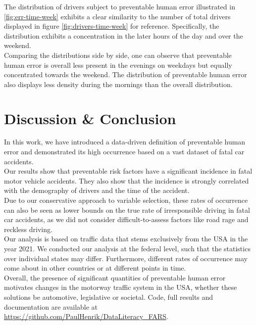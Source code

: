 \documentclass{article}
\theoremstyle{plain}
\theoremstyle{definition}
\theoremstyle{remark}
\begin{document}
\hfill \break
The distribution of drivers subject to preventable human error illustrated in \ref{fig:err-time-week} exhibits a clear similarity to the number of total drivers displayed in figure \ref{fig:drivers-time-week} for reference. Specifically, the distribution exhibits a concentration in the later hours of the day and over the weekend.\\
Comparing the distributions side by side, one can observe that preventable human error is overall less present in the evenings on weekdays but equally concentrated towards the weekend. The distribution of preventable human error also displays less density during the mornings than the overall distribution.
\section{Discussion \& Conclusion}\label{sec:conclusion}

In this work, we have introduced a data-driven definition of preventable human error and demonstrated its high occurrence based on a vast dataset of fatal car accidents.
\\
Our results show that preventable risk factors have a significant incidence in fatal motor vehicle accidents. They also show that the incidence is strongly correlated with the demography of drivers and the time of the accident.
\\
Due to our conservative approach to variable selection, these rates of occurrence can also be seen as lower bounds on the true rate of irresponsible driving in fatal car accidents, as we did not consider difficult-to-assess factors like road rage and reckless driving.
\\
Our analysis is based on traffic data that stems exclusively from the USA in the year 2021. We conducted our analysis at the federal level, such that the statistics over individual states may differ. Furthermore, different rates of occurrence may come about in other countries or at different points in time.
\\
Overall, the presence of significant quantities of preventable human error motivates changes in the motorway traffic system in the USA, whether these solutions be automotive, legislative or societal. Code, full results and documentation are available at \url{https://github.com/PaulHenrik/DataLiteracy_FARS}.
\end{document}
